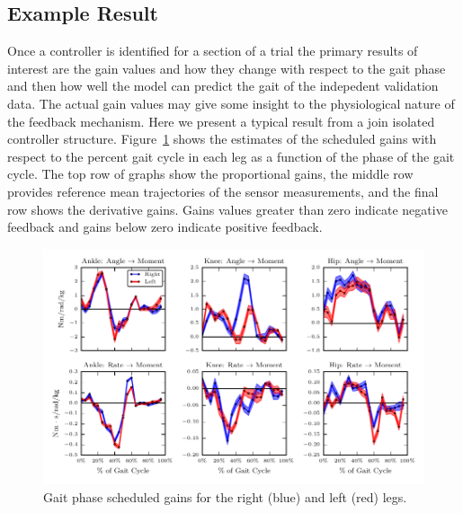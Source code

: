 \documentclass{article}
\begin{document}
\subsection*{Example Result}
%
Once a controller is identified for a section of a trial the primary results of
interest are the gain values and how they change with respect to the gait phase
and then how well the model can predict the gait of the indepedent validation
data. The actual gain values may give some insight to the physiological nature
of the feedback mechanism. Here we present a typical result from a join
isolated controller structure. Figure~\ref{fig:example-gains}  shows the estimates of the
scheduled gains with respect to the percent gait cycle in each leg as a
function of the phase of the gait cycle. The top row of graphs show the
proportional gains, the middle row provides reference mean trajectories of the
sensor measurements, and the final row shows the derivative gains. Gains values
greater than zero indicate negative feedback and gains below zero indicate
positive feedback. 
%
\begin{figure}
  \begin{center}
    \includegraphics{figures/example-identified-joint-isolated-gains.pdf}
    \caption{Gait phase scheduled gains for the right (blue) and left
      (red) legs.}
    \label{fig:example-gains}
  \end{center}
\end{figure}
\end{document}
